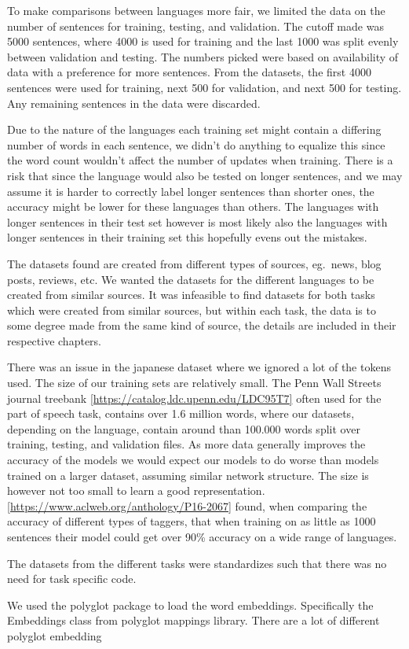 To make comparisons between languages more fair, we limited the data on the
number of sentences for training, testing, and validation. The cutoff made was
5000 sentences, where 4000 is used for training and the last 1000 was split
evenly between validation and testing. The numbers picked were based on
availability of data with a preference for more sentences. From the datasets,
the first 4000 sentences were used for training, next 500 for validation, and
next 500 for testing. Any remaining sentences in the data were discarded.

Due to the nature of the languages each training set might contain a differing
number of words in each sentence, we didn't do anything to equalize this since
the word count wouldn't affect the number of updates when training. There is a
risk that since the language would also be tested on longer sentences, and we
may assume it is harder to correctly label longer sentences than shorter ones,
the accuracy might be lower for these languages than others. The languages with
longer sentences in their test set however is most likely also the languages
with longer sentences in their training set this hopefully evens out the
mistakes.

The datasets found are created from different types of sources, eg.\ news, blog
posts, reviews, etc. We wanted the datasets for the different languages to be
created from similar sources. It was infeasible to find datasets for both tasks
which were created from similar sources, but within each task, the data is to
some degree made from the same kind of source, the details are included in their
respective chapters.

There was an issue in the japanese dataset where we ignored a lot of the tokens used.
The size of our training sets are relatively small. The Penn Wall Streets
journal treebank \ref{https://catalog.ldc.upenn.edu/LDC95T7} often used for the
part of speech task, contains over 1.6 million words, where our datasets,
depending on the language, contain around than 100.000 words split over
training, testing, and validation files. As more data generally improves the
accuracy of the models we would expect our models to do worse than models
trained on a larger dataset, assuming similar network structure. The size is
however not too small to learn a good representation.
\ref{https://www.aclweb.org/anthology/P16-2067} found, when comparing the
accuracy of different types of taggers, that when training on as little as 1000
sentences their model could get over 90\% accuracy on a wide range of languages.


The datasets from the different tasks were standardizes such that there was no
need for task specific code. 

We used the polyglot package to load the word embeddings. Specifically the
Embeddings class from polyglot mappings library. 
There are a lot of different polyglot embedding 


\pagebreak
